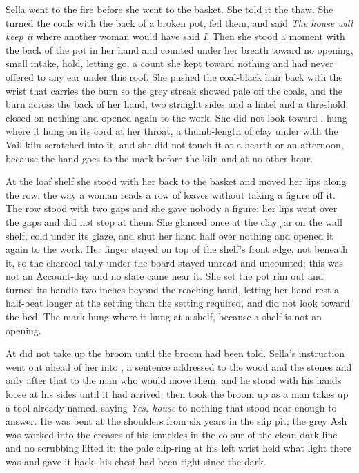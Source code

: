 Sella went to the fire before she went to the basket. She told it the thaw. She turned the coals with the back of a broken pot, fed them, and said \emph{The house will keep it} where another woman would have said \emph{I}. Then she stood a moment with the back of the pot in her hand and counted under her breath toward no opening, small intake, hold, letting go, a count she kept toward nothing and had never offered to any ear under this roof. She pushed the coal-black hair back with the wrist that carries the burn so the grey streak showed pale off the coals, and the burn across the back of her hand, two straight sides and a lintel and a threshold, closed on nothing and opened again to the work. She did not look toward .  hung where it hung on its cord at her throat, a thumb-length of clay under  with the Vail kiln scratched into it, and she did not touch it at a hearth or an afternoon, because the hand goes to the mark before the kiln and at no other hour.

At the loaf shelf she stood with her back to the basket and moved her lips along the row, the way a woman reads a row of loaves without taking a figure off it. The row stood with two gaps and she gave nobody a figure; her lips went over the gaps and did not stop at them. She glanced once at the clay jar on the wall shelf, cold under its glaze, and shut her hand half over nothing and opened it again to the work. Her finger stayed on top of the shelf's front edge, not beneath it, so the charcoal tally under the board stayed unread and uncounted; this was not an Account-day and no slate came near it. She set the pot rim out and turned its handle two inches beyond the reaching hand, letting her hand rest a half-beat longer at the setting than the setting required, and did not look toward the bed. The mark hung where it hung at a shelf, because a shelf is not an opening.

At   did not take up the broom until the broom had been told. Sella's instruction went out ahead of her into , a sentence addressed to the wood and the stones and only after that to the man who would move them, and he stood with his hands loose at his sides until it had arrived, then took the broom up as a man takes up a tool already named, saying \emph{Yes, house} to nothing that stood near enough to answer. He was bent at the shoulders from six years in the slip pit; the grey Ash was worked into the creases of his knuckles in the colour of the clean dark line and no scrubbing lifted it; the pale clip-ring at his left wrist held what light there was and gave it back; his chest had been tight since the dark.

